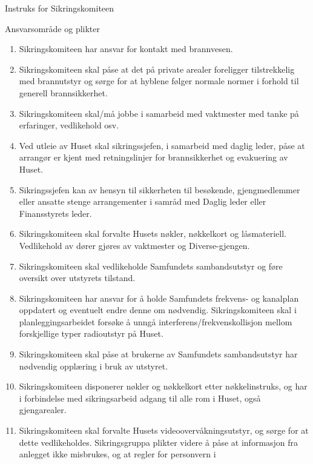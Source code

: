 \begin{instruks*}{Instruks for Sikringskomiteen}
\begin{instruksledd}{Ansvarsområde og plikter}
\begin{enumerate}
                sikringsgruppa til resten av Husets gjengmedlemmer. Sikringssjefen
                har ansvaret for brannøvelser.
            \item Sikringskomiteen har ansvar for kontakt med brannvesen.
            \item Sikringskomiteen skal påse at det på private arealer foreligger
                tilstrekkelig med brannutstyr og sørge for at
                hyblene følger normale normer i forhold til generell brannsikkerhet.
            \item Sikringskomiteen skal/må jobbe i samarbeid med vaktmester med tanke på
                erfaringer, vedlikehold osv.
            \item Ved utleie av Huset skal sikringssjefen, i samarbeid med daglig leder,
                påse at arrangør er kjent med
                retningslinjer for brannsikkerhet og evakuering av Huset.
            \item Sikringssjefen kan av hensyn til sikkerheten til besøkende,
                gjengmedlemmer eller ansatte stenge
                arrangementer i samråd med Daglig leder eller Finansstyrets leder.
            \item Sikringskomiteen skal forvalte Husets nøkler, nøkkelkort og låsmateriell.
                Vedlikehold av dører gjøres av
                vaktmester og Diverse-gjengen.
	    \item Sikringskomiteen skal vedlikeholde Samfundets sambandsutstyr og føre oversikt
		over utstyrets tilstand.
            \item Sikringskomiteen har ansvar for å holde Samfundets frekvens- og kanalplan
		oppdatert og eventuelt endre denne om nødvendig. Sikringskomiteen skal i
		planleggingsarbeidet forsøke å unngå interferens/frekvenskollisjon mellom
		forskjellige typer radioutstyr på Huset.
            \item Sikringskomiteen skal påse at brukerne av Samfundets sambandsutstyr har
		nødvendig opplæring i bruk av utstyret.
            \item Sikringskomiteen disponerer nøkler og nøkkelkort etter nøkkelinstruks,
                og har i forbindelse med
                sikringsarbeid adgang til alle rom i Huset, også gjengarealer.
            \item Sikringskomiteen skal forvalte Husets videoovervåkningsutstyr, og sørge
                for at dette vedlikeholdes.
                Sikringsgruppa plikter videre å påse at informasjon fra anlegget ikke
                misbrukes, og at regler for personvern i

\end{enumerate}
\end{instruksledd}
\end{instruks*}
